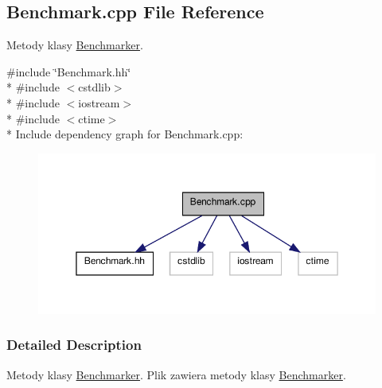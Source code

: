 \hypertarget{a00002}{\subsection{Benchmark.\-cpp File Reference}
\label{a00002}
}


Metody klasy \hyperlink{a00001}{Benchmarker}.  


{\ttfamily \#include \char`\"{}Benchmark.\-hh\char`\"{}}\\*
{\ttfamily \#include $<$cstdlib$>$}\\*
{\ttfamily \#include $<$iostream$>$}\\*
{\ttfamily \#include $<$ctime$>$}\\*
Include dependency graph for Benchmark.\-cpp\-:
\nopagebreak
\begin{figure}[H]
\begin{center}
\leavevmode
\includegraphics[width=350pt]{a00007}
\end{center}
\end{figure}


\subsubsection{Detailed Description}
Metody klasy \hyperlink{a00001}{Benchmarker}. Plik zawiera metody klasy \hyperlink{a00001}{Benchmarker}. 